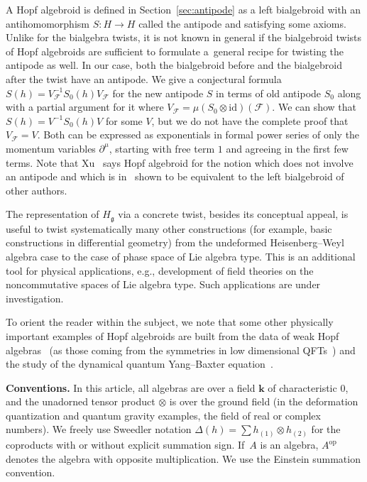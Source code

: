 \documentclass[pdftex]{sigma}
\def\op{\mathrm{op}}
\def\genfd{\mathbf{k}}
\def\gg{\mathfrak{g}}
\def\id{\mathrm{id}}
\numberwithin{equation}{section}
\begin{document}
A Hopf algebroid is defined in Section~\ref{sec:antipode} as a left bialgebroid with an antihomomorphism $S\colon H\to H$ called the antipode and satisfying some axioms. Unlike for the bialgebra twists, it is not known in general if the bialgebroid twists of Hopf algebroids are sufficient to formulate a~general recipe for twisting the antipode as well. In our case, both the bialgebroid before and the bialgebroid after the twist have an antipode. We give a conjectural formula $S(h) = V_{\mathcal{F}}^{-1}S_0(h)V_{\mathcal{F}}$ for the new antipode $S$ in terms of old antipode $S_0$ along with a partial argument for it where $V_{\mathcal{F}} = \mu(S_0\otimes\id)(\mathcal{F})$. We can show that $S(h) = V^{-1}S_0(h)V$ for some $V$, but we do not have the complete proof that $V_{\mathcal{F}} = V$. Both can be expressed as exponentials in formal power series of only the momentum variables $\partial^\mu$, starting with free term $1$ and agreeing in the first few terms. Note that Xu~\cite{xu} says Hopf algebroid for the notion
which does not involve an antipode and which is in~\cite{BrzMilitaru} shown to be equivalent to the left bialgebroid of other authors.

The representation of $H_\gg$ via a concrete twist, besides its conceptual appeal, is useful to twist systematically many other constructions (for example, basic constructions in differential geometry) from the undeformed Heisenberg--Weyl algebra case to the case of phase space of Lie algebra type. This is an additional tool for physical applications, e.g., development of field theories on the noncommutative spaces of Lie algebra type. Such applications are under investigation.

To orient the reader within the subject, we note that some other physically important examples of Hopf algebroids are built from the data of weak Hopf algebras~\cite{bohmHbk} (as those coming from the symmetries in low dimensional QFTs~\cite{mackschomerus}) and the study of the
dynamical quantum Yang--Baxter equation~\cite{doninmudrov,xu}.

{\bf Conventions.} In this article, all algebras are over a field $\genfd$ of characteristic $0$, and the unadorned tensor product $\otimes$ is over the ground field (in the deformation quantization and quantum gravity examples, the field of real or complex numbers). We freely use Sweedler
notation $\Delta(h) = \sum h_{(1)}\otimes h_{(2)}$ for the coproducts with or without explicit summation sign. If~$A$ is an algebra, $A^\op$ denotes the algebra with opposite multiplication. We use the Einstein summation convention.
\end{document}
